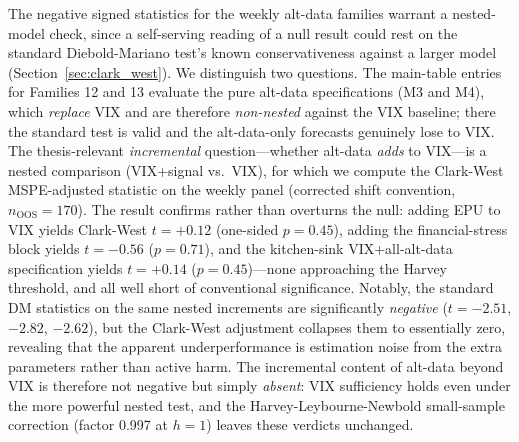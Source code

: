 \documentclass[12pt,a4paper]{article}
\begin{document}
The negative signed statistics for the weekly alt-data families warrant a nested-model check, since a self-serving reading of a null result could rest on the standard Diebold-Mariano test's known conservativeness against a larger model (Section~\ref{sec:clark_west}). We distinguish two questions. The main-table entries for Families 12 and 13 evaluate the pure alt-data specifications (M3 and M4), which \emph{replace} VIX and are therefore \emph{non-nested} against the VIX baseline; there the standard test is valid and the alt-data-only forecasts genuinely lose to VIX. The thesis-relevant \emph{incremental} question---whether alt-data \emph{adds} to VIX---is a nested comparison (VIX+signal vs.\ VIX), for which we compute the Clark-West MSPE-adjusted statistic on the weekly panel (corrected shift convention, $n_{\text{OOS}} = 170$). The result confirms rather than overturns the null: adding EPU to VIX yields Clark-West $t = +0.12$ (one-sided $p = 0.45$), adding the financial-stress block yields $t = -0.56$ ($p = 0.71$), and the kitchen-sink VIX+all-alt-data specification yields $t = +0.14$ ($p = 0.45$)---none approaching the Harvey threshold, and all well short of conventional significance. Notably, the standard DM statistics on the same nested increments are significantly \emph{negative} ($t = -2.51$, $-2.82$, $-2.62$), but the Clark-West adjustment collapses them to essentially zero, revealing that the apparent underperformance is estimation noise from the extra parameters rather than active harm. The incremental content of alt-data beyond VIX is therefore not negative but simply \emph{absent}: VIX sufficiency holds even under the more powerful nested test, and the Harvey-Leybourne-Newbold small-sample correction (factor 0.997 at $h=1$) leaves these verdicts unchanged.
\end{document}
